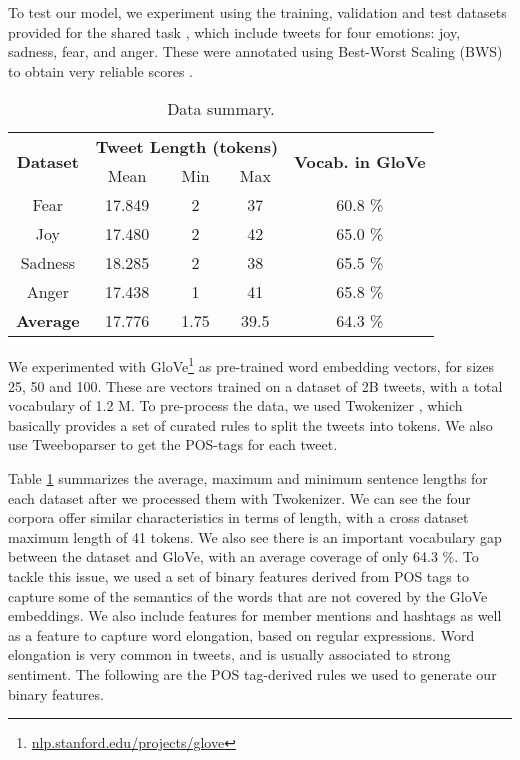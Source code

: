 \documentclass[11pt,letterpaper]{article}
\begin{document}
To test our model, we experiment using the training, validation and test datasets provided for the shared task \cite{mohammadB17starsem}, which include tweets for four emotions: joy, sadness, fear, and anger. These were annotated using Best-Worst Scaling (BWS) to obtain very reliable scores \cite{kiritchenko-mohammad:2016:N16-11}. 

\begin{table}[h!]
	\footnotesize
	\centering
	\begin{tabular}{c | c | c | c | c}
		\multirow{2}{*}{\textbf{Dataset}} & \multicolumn{3}{|c|}{\textbf{Tweet Length (tokens)}} & \multirow{2}{*}{\textbf{Vocab. in GloVe}}\\
		\cline{2-4}
		& Mean & Min & Max & \\
		\hline
		Fear 	&	17.849 	& 2 	& 37 	& 60.8 \% \\
		Joy 	& 	17.480	& 2		& 42 	& 65.0 \% \\
		Sadness	& 	18.285	& 2		& 38 	& 65.5 \% \\
		Anger	&	17.438	& 1		& 41 	& 65.8 \% \\
		\hline
		\textbf{Average} &   17.776  & 1.75  & 39.5	& 64.3 \%
	\end{tabular}
	\caption{Data summary.}
	\label{table:data_summary}
\end{table}


We experimented with GloVe\footnote{\url{nlp.stanford.edu/projects/glove}} \cite{pennington2014glove} as pre-trained word embedding vectors, for sizes 25, 50 and 100. These are vectors trained on a dataset of 2B tweets, with a total vocabulary of 1.2 M. To pre-process the data, we used Twokenizer \cite{gimpel-EtAl:2011:ACL-HLT2011}, which basically provides a set of curated rules to split the tweets into tokens. We also use Tweeboparser \cite{owoputi-EtAl:2013:NAACL-HLT} to get the POS-tags for each tweet. 

Table \ref{table:data_summary} summarizes the average, maximum and minimum sentence lengths for each dataset after we processed them with Twokenizer. We can see the four corpora offer similar characteristics in terms of length, with a cross dataset maximum length of 41 tokens. We also see there is an important vocabulary gap between the dataset and GloVe, with an average coverage of only 64.3 \%. To tackle this issue, we used a set of binary features derived from POS tags to capture some of the semantics of the words that are not covered by the GloVe embeddings. We also include features for member mentions and hashtags as well as a feature to capture word elongation, based on regular expressions. Word elongation is very common in tweets, and is usually associated to strong sentiment. The following are the POS tag-derived rules we used to generate our binary features.
\end{document}
